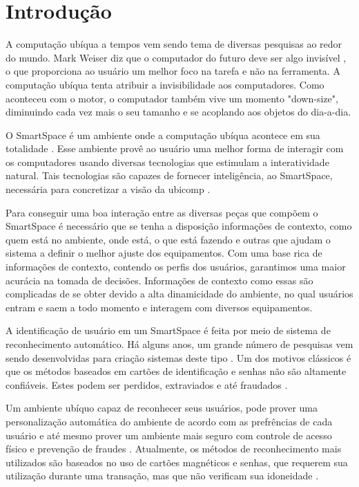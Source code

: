 
\chapter{Introdução}
	
A computação ubíqua a tempos vem sendo tema de diversas pesquisas ao redor do mundo. Mark Weiser diz que o computador do futuro deve ser algo invisível \cite{weiser1,weiser2}, o que proporciona ao usuário um melhor foco na tarefa e não na ferramenta. A computação ubíqua tenta atribuir a invisibilidade aos computadores. Como aconteceu com o motor, o computador também vive um momento "down-size", diminuindo cada vez mais o seu tamanho e se acoplando aos objetos do dia-a-dia.

O SmartSpace é um ambiente onde a computação ubíqua acontece em sua totalidade \cite{gregoryabowd}. Esse ambiente provê ao usuário uma melhor forma de interagir com os computadores usando diversas tecnologias que estimulam a interatividade natural. Tais tecnologias são capazes de fornecer inteligência, ao SmartSpace, necessária para concretizar a visão da ubicomp \cite{fabriciobuzzeto}.

Para conseguir uma boa interação entre as diversas peças que compõem o SmartSpace é necessário que se tenha a disposição informações de contexto,  como quem está no ambiente, onde está, o que está fazendo e outras que ajudam o sistema a definir o melhor ajuste dos equipamentos. Com uma base rica de informações de contexto, contendo os perfis dos usuários, garantimos uma maior acurácia na tomada de decisões. Informações de contexto como essas são complicadas de se obter devido a alta dinamicidade do ambiente, no qual usuários entram e saem a todo momento e interagem com diversos equipamentos.

A identificação de usuário em um SmartSpace é feita por meio de sistema de reconhecimento automático. Há alguns anos, um grande número de pesquisas vem sendo desenvolvidas para criação sistemas deste tipo \cite{saocarlos}. Um dos motivos clássicos é que os métodos baseados em cartões de identificação e senhas não são altamente confiáveis. Estes podem ser perdidos, extraviados e até fraudados \cite{bolle}.

Um ambiente ubíquo capaz de reconhecer seus usuários, pode prover uma personalização automática do ambiente de acordo com as prefrências de cada usuário e até mesmo prover um ambiente mais seguro com controle de acesso físico e prevenção de fraudes \cite{saocarlos}. Atualmente, os métodos de reconhecimento mais utilizados são baseados no uso de cartões magnéticos e senhas, que requerem sua utilização durante uma transação, mas que não verificam sua idoneidade \cite{daugman}.

